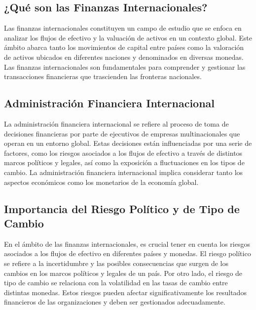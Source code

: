\documentclass[
  letterpaper,
  DIV=11,
  numbers=noendperiod]{scrartcl}
\begin{document}
\hypertarget{quuxe9-son-las-finanzas-internacionales}{%
\subsection{¿Qué son las Finanzas
Internacionales?}\label{quuxe9-son-las-finanzas-internacionales}}

Las finanzas internacionales constituyen un campo de estudio que se
enfoca en analizar los flujos de efectivo y la valuación de activos en
un contexto global. Este ámbito abarca tanto los movimientos de capital
entre países como la valoración de activos ubicados en diferentes
naciones y denominados en diversas monedas. Las finanzas internacionales
son fundamentales para comprender y gestionar las transacciones
financieras que trascienden las fronteras nacionales.

\hypertarget{administraciuxf3n-financiera-internacional}{%
\subsection{Administración Financiera
Internacional}\label{administraciuxf3n-financiera-internacional}}

La administración financiera internacional se refiere al proceso de toma
de decisiones financieras por parte de ejecutivos de empresas
multinacionales que operan en un entorno global. Estas decisiones están
influenciadas por una serie de factores, como los riesgos asociados a
los flujos de efectivo a través de distintos marcos políticos y legales,
así como la exposición a fluctuaciones en los tipos de cambio. La
administración financiera internacional implica considerar tanto los
aspectos económicos como los monetarios de la economía global.

\hypertarget{importancia-del-riesgo-poluxedtico-y-de-tipo-de-cambio}{%
\subsection{Importancia del Riesgo Político y de Tipo de
Cambio}\label{importancia-del-riesgo-poluxedtico-y-de-tipo-de-cambio}}

En el ámbito de las finanzas internacionales, es crucial tener en cuenta
los riesgos asociados a los flujos de efectivo en diferentes países y
monedas. El riesgo político se refiere a la incertidumbre y las posibles
consecuencias que surgen de los cambios en los marcos políticos y
legales de un país. Por otro lado, el riesgo de tipo de cambio se
relaciona con la volatilidad en las tasas de cambio entre distintas
monedas. Estos riesgos pueden afectar significativamente los resultados
financieros de las organizaciones y deben ser gestionados adecuadamente.
\end{document}
